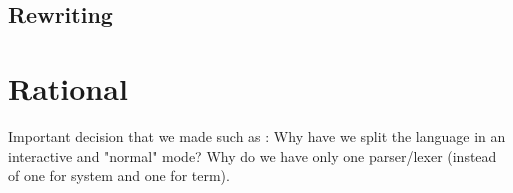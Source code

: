 \documentclass[12pt,a4paper]{article}
\begin{document}
\subsection{Rewriting}
\label{rewriting}

\section{Rational}
\label{rational}
Important decision that we made such as : Why have we split the language in an interactive and "normal" mode? Why do we have only one parser/lexer (instead of one for system and one for term).
\end{document}
